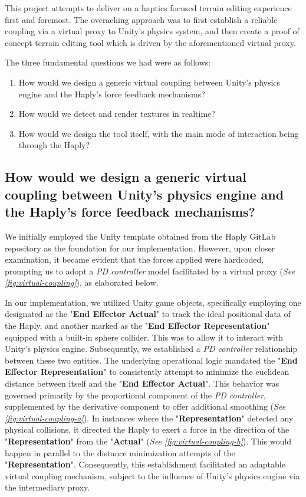 This project attempts to deliver on a haptics focused terrain editing experience first and foremost. The overaching approach was to first establish a reliable coupling via a virtual proxy to Unity's physics system, and then create a proof of concept terrain editing tool which is driven by the aforementioned virtual proxy.

The three fundamental questions we had were as follows:

\begin{enumerate}
    \item How would we design a generic virtual coupling between Unity's physics engine and the Haply's force feedback mechanisms?
    \item How would we detect and render textures in realtime?
    \item How would we design the tool itself, with the main mode of interaction being through the Haply?
\end{enumerate}

\subsection{How would we design a generic virtual coupling between Unity's physics engine and the Haply's force feedback mechanisms?}

We initially employed the Unity template obtained from the Haply GitLab repository as the foundation for our implementation. However, upon closer examination, it became evident that the forces applied were hardcoded, prompting us to adopt a \textit{PD controller} model facilitated by a virtual proxy (\textit{See \ref*{fig:virtual-coupling}}), as elaborated below.

In our implementation, we utilized Unity game objects, specifically employing one designated as the "\textbf{End Effector Actual}" to track the ideal positional data of the Haply, and another marked as the "\textbf{End Effector Representation}" equipped with a built-in sphere collider. This was to allow it to interact with Unity's physics engine. Subsequently, we established a \textit{PD controller} relationship between these two entities. The underlying operational logic mandated the "\textbf{End Effector Representation}" to consistently attempt to minimize the euclidean distance between itself and the "\textbf{End Effector Actual}". This behavior was governed primarily by the proportional component of the \textit{PD controller}, supplemented by the derivative component to offer additional smoothing (\textit{See \ref*{fig:virtual-coupling-a}}). In instances where the "\textbf{Representation}" detected any physical collisions, it directed the Haply to exert a force in the direction of the "\textbf{Representation}" from the "\textbf{Actual}" (\textit{See \ref*{fig:virtual-coupling-b}}). This would happen in parallel to the distance minimization attempts of the "\textbf{Representation}". Consequently, this establishment facilitated an adaptable virtual coupling mechanism, subject to the influence of Unity's physics engine via the intermediary proxy.


